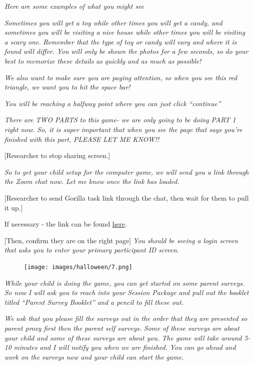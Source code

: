 \documentclass[
]{book}
\begin{document}
\emph{Here are some examples of what you might see}

\emph{Sometimes you will get a toy while other times you will get a candy, and sometimes you will be visiting a nice house while other times you will be visiting a scary one. Remember that the type of toy or candy will vary and where it is found will differ. You will only be shown the photos for a few seconds, so do your best to memorize these details as quickly and as much as possible!}

\emph{We also want to make sure you are paying attention, so when you see this red triangle, we want you to hit the space bar!}

\emph{You will be reaching a halfway point where you can just click ``continue''}

\emph{There are TWO PARTS to this game- we are only going to be doing PART 1 right now. So, it is super important that when you see the page that says you're finished with this part, PLEASE LET ME KNOW!!}

{[}Researcher to stop sharing screen.{]}

\emph{So to get your child setup for the computer game, we will send you a link through the Zoom chat now. Let me know once the link has loaded.}

{[}Researcher to send Gorilla task link through the chat, then wait for them to pull it up.{]}

If necessary - the link can be found \href{https://research.sc/participant/login/20451/publicid}{here}.

{[}Then, confirm they are on the right page{]} \emph{You should be seeing a login screen that asks you to enter your primary participant ID screen.}

\begin{figure}
\centering
\texttt{[image: images/halloween/7.png]}
\caption{}
\end{figure}

\emph{While your child is doing the game, you can get started on some parent surveys. So now I will ask you to reach into your Session Package and pull out the booklet titled ``Parent Survey Booklet'' and a pencil to fill these out.}

\emph{We ask that you please fill the surveys out in the order that they are presented so parent proxy first then the parent self surveys. Some of these surveys are about your child and some of these surveys are about you. The game will take around 5-10 minutes and I will notify you when we are finished. You can go ahead and work on the surveys now and your child can start the game.}
\end{document}
